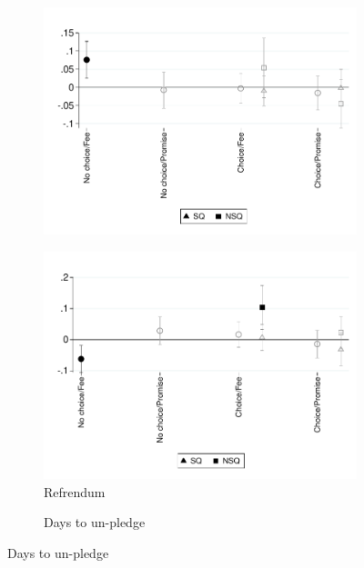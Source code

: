 \documentclass[11pt]{article}
\begin{document}
\begin{figure}[H]
\begin{center}
\begin{subfigure}{0.4\textwidth}
        \centering
        \includegraphics[width=\textwidth]{Figuras/te_graph_sum_porcp_c.pdf}
    \end{subfigure}
     \begin{subfigure}{0.4\textwidth}
      \caption{Refrendum}
        \centering
        \includegraphics[width=\textwidth]{Figuras/te_graph_ref_c.pdf}
    \end{subfigure}
      \begin{subfigure}{0.4\textwidth}
      \caption{Days to un-pledge}
        \centering

\end{subfigure}
\end{center}
\end{figure}
\end{document}
